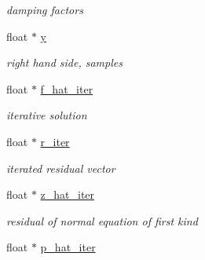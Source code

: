 \begin{DoxyCompactItemize}
\begin{DoxyCompactList}\small\item\em damping factors \end{DoxyCompactList}\item 
\hypertarget{structsolverf__plan__double_a31aa1269dccbcfad158f31c276b0399e}{float $\ast$ \hyperlink{structsolverf__plan__double_a31aa1269dccbcfad158f31c276b0399e}{y}}\label{structsolverf__plan__double_a31aa1269dccbcfad158f31c276b0399e}

\begin{DoxyCompactList}\small\item\em right hand side, samples \end{DoxyCompactList}\item 
\hypertarget{structsolverf__plan__double_aab9daf7841a5f6b3a059921713736e3c}{float $\ast$ \hyperlink{structsolverf__plan__double_aab9daf7841a5f6b3a059921713736e3c}{f\-\_\-hat\-\_\-iter}}\label{structsolverf__plan__double_aab9daf7841a5f6b3a059921713736e3c}

\begin{DoxyCompactList}\small\item\em iterative solution \end{DoxyCompactList}\item 
\hypertarget{structsolverf__plan__double_a6261a160be099d721856fab16f31cf22}{float $\ast$ \hyperlink{structsolverf__plan__double_a6261a160be099d721856fab16f31cf22}{r\-\_\-iter}}\label{structsolverf__plan__double_a6261a160be099d721856fab16f31cf22}

\begin{DoxyCompactList}\small\item\em iterated residual vector \end{DoxyCompactList}\item 
\hypertarget{structsolverf__plan__double_aeee7fa961ebdf43e0caf1108e6b5ada7}{float $\ast$ \hyperlink{structsolverf__plan__double_aeee7fa961ebdf43e0caf1108e6b5ada7}{z\-\_\-hat\-\_\-iter}}\label{structsolverf__plan__double_aeee7fa961ebdf43e0caf1108e6b5ada7}

\begin{DoxyCompactList}\small\item\em residual of normal equation of first kind \end{DoxyCompactList}\item 
\hypertarget{structsolverf__plan__double_a6987fb320cd6798faabe9dfd92a494f2}{float $\ast$ \hyperlink{structsolverf__plan__double_a6987fb320cd6798faabe9dfd92a494f2}{p\-\_\-hat\-\_\-iter}}\label{structsolverf__plan__double_a6987fb320cd6798faabe9dfd92a494f2}


\end{DoxyCompactItemize}

